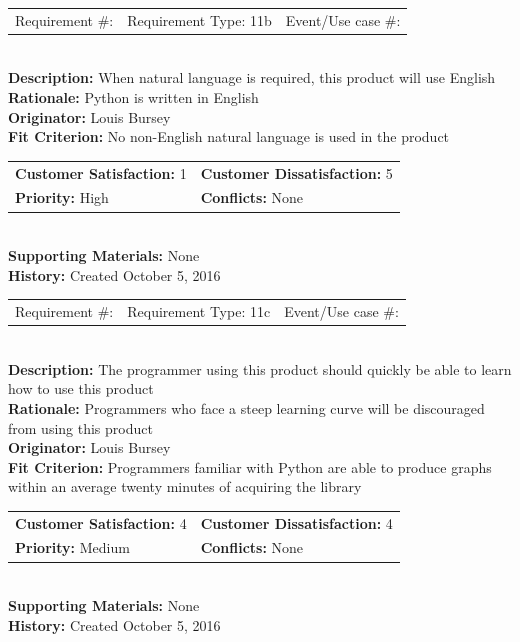 \documentclass[12pt, titlepage]{article}
\begin{document}
%
%
\begin{reqbox}
\begin{tabular}{ccc}
Requirement \#: & Requirement Type: 11b & Event/Use case \#: \\
\end{tabular} \\
\textbf{Description:} When natural language is required, this product will use English \\
\textbf{Rationale:} Python is written in English \\
\textbf{Originator:} Louis Bursey\\
\textbf{Fit Criterion:}  No non-English natural language is used in the product \\
\begin{tabular}{ll}
\textbf{Customer Satisfaction:} 1 & \textbf{Customer Dissatisfaction:} 5 \\
\textbf{Priority:} High & \textbf{Conflicts:} None\\
\end{tabular} \\
\textbf{Supporting Materials:} None \\
\textbf{History:} Created October 5, 2016
\end{reqbox}
%
%
%
%
\begin{reqbox}
\begin{tabular}{ccc}
Requirement \#: & Requirement Type: 11c & Event/Use case \#: \\
\end{tabular} \\
\textbf{Description:} The programmer using this product should quickly be able to learn how to use this product \\
\textbf{Rationale:} Programmers who face a steep learning curve will be discouraged from using this product \\
\textbf{Originator:} Louis Bursey\\
\textbf{Fit Criterion:}  Programmers familiar with Python are able to produce graphs within an average twenty minutes of acquiring the library \\
\begin{tabular}{ll}
\textbf{Customer Satisfaction:} 4 & \textbf{Customer Dissatisfaction:} 4 \\
\textbf{Priority:} Medium & \textbf{Conflicts:} None\\
\end{tabular} \\
\textbf{Supporting Materials:} None \\
\textbf{History:} Created October 5, 2016
\end{reqbox}
\end{document}
